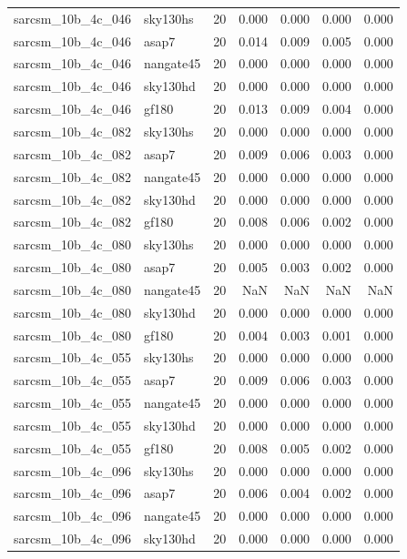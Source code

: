 \begin{tabular}{llrrrrr}
sarcsm\_10b\_4c\_046 & sky130hs & 20 & 0.000 & 0.000 & 0.000 & 0.000 \\
sarcsm\_10b\_4c\_046 & asap7 & 20 & 0.014 & 0.009 & 0.005 & 0.000 \\
sarcsm\_10b\_4c\_046 & nangate45 & 20 & 0.000 & 0.000 & 0.000 & 0.000 \\
sarcsm\_10b\_4c\_046 & sky130hd & 20 & 0.000 & 0.000 & 0.000 & 0.000 \\
sarcsm\_10b\_4c\_046 & gf180 & 20 & 0.013 & 0.009 & 0.004 & 0.000 \\
sarcsm\_10b\_4c\_082 & sky130hs & 20 & 0.000 & 0.000 & 0.000 & 0.000 \\
sarcsm\_10b\_4c\_082 & asap7 & 20 & 0.009 & 0.006 & 0.003 & 0.000 \\
sarcsm\_10b\_4c\_082 & nangate45 & 20 & 0.000 & 0.000 & 0.000 & 0.000 \\
sarcsm\_10b\_4c\_082 & sky130hd & 20 & 0.000 & 0.000 & 0.000 & 0.000 \\
sarcsm\_10b\_4c\_082 & gf180 & 20 & 0.008 & 0.006 & 0.002 & 0.000 \\
sarcsm\_10b\_4c\_080 & sky130hs & 20 & 0.000 & 0.000 & 0.000 & 0.000 \\
sarcsm\_10b\_4c\_080 & asap7 & 20 & 0.005 & 0.003 & 0.002 & 0.000 \\
sarcsm\_10b\_4c\_080 & nangate45 & 20 & NaN & NaN & NaN & NaN \\
sarcsm\_10b\_4c\_080 & sky130hd & 20 & 0.000 & 0.000 & 0.000 & 0.000 \\
sarcsm\_10b\_4c\_080 & gf180 & 20 & 0.004 & 0.003 & 0.001 & 0.000 \\
sarcsm\_10b\_4c\_055 & sky130hs & 20 & 0.000 & 0.000 & 0.000 & 0.000 \\
sarcsm\_10b\_4c\_055 & asap7 & 20 & 0.009 & 0.006 & 0.003 & 0.000 \\
sarcsm\_10b\_4c\_055 & nangate45 & 20 & 0.000 & 0.000 & 0.000 & 0.000 \\
sarcsm\_10b\_4c\_055 & sky130hd & 20 & 0.000 & 0.000 & 0.000 & 0.000 \\
sarcsm\_10b\_4c\_055 & gf180 & 20 & 0.008 & 0.005 & 0.002 & 0.000 \\
sarcsm\_10b\_4c\_096 & sky130hs & 20 & 0.000 & 0.000 & 0.000 & 0.000 \\
sarcsm\_10b\_4c\_096 & asap7 & 20 & 0.006 & 0.004 & 0.002 & 0.000 \\
sarcsm\_10b\_4c\_096 & nangate45 & 20 & 0.000 & 0.000 & 0.000 & 0.000 \\
sarcsm\_10b\_4c\_096 & sky130hd & 20 & 0.000 & 0.000 & 0.000 & 0.000 \\

\end{tabular}
